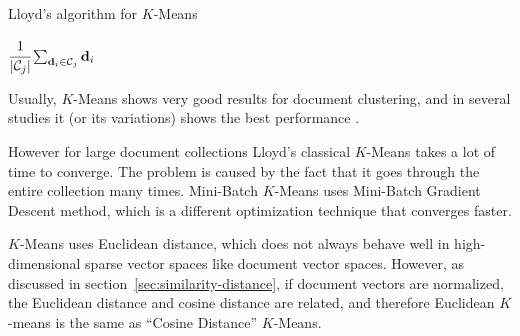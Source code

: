 \begin{algorithm}
\caption{Lloyd's algorithm for $K$-Means}
\label{algo:k-means}

\begin{algorithmic}[0]
  \Statex
     
    \EndFor

       
      \EndFor

       
            {$\cfrac{1}{| \mathcal C_j |} \sum_{\mathbf d_i \in \mathcal C_j} \mathbf d_i$}
      \EndFor
    \EndWhile

    \State {}
  \EndFunction
\end{algorithmic}
\end{algorithm}

Usually, $K$-Means shows very good results for document clustering, and in
several studies it (or its variations) shows the best performance
\cite{steinbach2000comparison} \cite{hall2012evaluating} .

However for large document collections Lloyd's classical $K$-Means takes a lot
of time to converge. The problem is caused by the fact that it goes through
the entire collection many times. Mini-Batch $K$-Means \cite{sculley2010web}
uses Mini-Batch Gradient Descent method, which is a different optimization technique
that converges faster.

$K$-Means uses Euclidean distance, which does not always behave
well in high-dimensional sparse vector spaces like document vector
spaces. However, as discussed in section~\ref{sec:similarity-distance}, if
document vectors are normalized, the Euclidean distance and cosine distance
are related, and therefore Euclidean $K$-means is the same as
``Cosine Distance'' $K$-Means.


